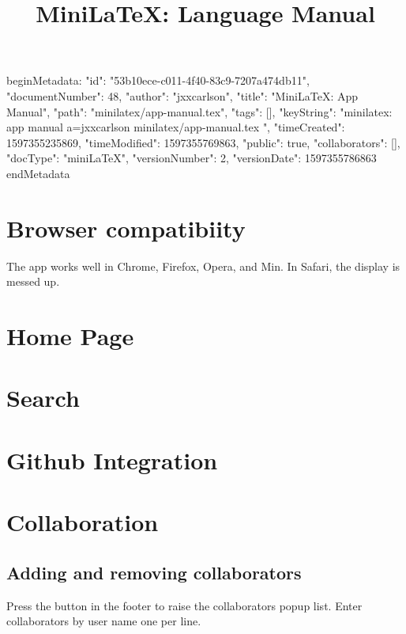 beginMetadata:
{
    "id": "53b10ece-c011-4f40-83c9-7207a474db11",
    "documentNumber": 48,
    "author": "jxxcarlson",
    "title": "MiniLaTeX: App Manual",
    "path": "minilatex/app-manual.tex",
    "tags": [],
    "keyString": "minilatex: app manual a=jxxcarlson minilatex/app-manual.tex ",
    "timeCreated": 1597355235869,
    "timeModified": 1597355769863,
    "public": true,
    "collaborators": [],
    "docType": "miniLaTeX",
    "versionNumber": 2,
    "versionDate": 1597355786863
}
endMetadata

\title{MiniLaTeX: Language Manual}

\maketitle

\tableofcontents


\section{Browser compatibiity}

The app works well in Chrome, Firefox, Opera, and Min.   In Safari, the display is messed up.


\section{Home Page}

\section{Search}

\section{Github Integration}


\section{Collaboration}

\subsection{Adding and removing collaborators}

Press the  button in the footer to raise the collaborators popup list.  Enter collaborators by user name one per line.


